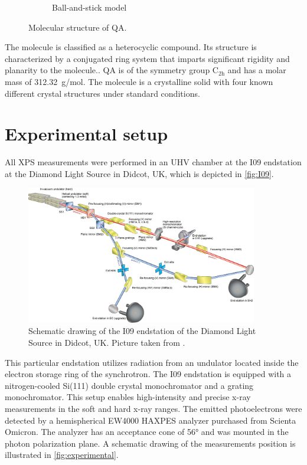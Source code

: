 \begin{figure}[H]
\begin{subfigure}[b]{0.48\linewidth}
		\caption{Ball-and-stick model}
	\end{subfigure}
	\caption{Molecular structure of \acf{QA}.}
	\label{fig:QA}
\end{figure}


The molecule is classified as a heterocyclic compound. Its structure is characterized by a conjugated ring system that imparts significant rigidity and planarity to the molecule.\autocite{PubChem2025}. \ac{QA} is of the symmetry group $\mathrm{C_{2h}}$ and has a molar mass of 312.32~\si{g/mol}. The molecule is a crystalline solid with four known different crystal structures under standard conditions.\autocite{Paulus2007,Mizuguchi2002}

\newpage
\section{Experimental setup}

All \ac{XPS} measurements were performed in an \ac{UHV} chamber at the I09 endstation at the Diamond Light Source in Didcot, UK, which is depicted in \autoref{fig:I09}.

\begin{figure}[htbp]
	\centering
	\includegraphics[width=0.9\textwidth]{images/I09.jpg}
	\caption{Schematic drawing of the I09 endstation of the Diamond Light Source in Didcot, UK. Picture taken from \cite{Diamond2025}.}
	\label{fig:I09}
\end{figure}

 This particular endstation utilizes radiation from an undulator located inside the electron storage ring of the synchrotron. The I09 endstation is equipped with a nitrogen-cooled Si(111) double crystal monochromator and a grating monochromator. This setup enables high-intensity and precise x-ray measurements in the soft and hard x-ray ranges. The emitted photoelectrons were detected by a hemispherical EW4000 HAXPES analyzer purchased from Scienta Omicron. The analyzer has an acceptance cone of 56\si{\degree} and was mounted in the photon polarization plane.\autocite{Diamond2025} A schematic drawing of the measurements position is illustrated in \autoref{fig:experimental}.

